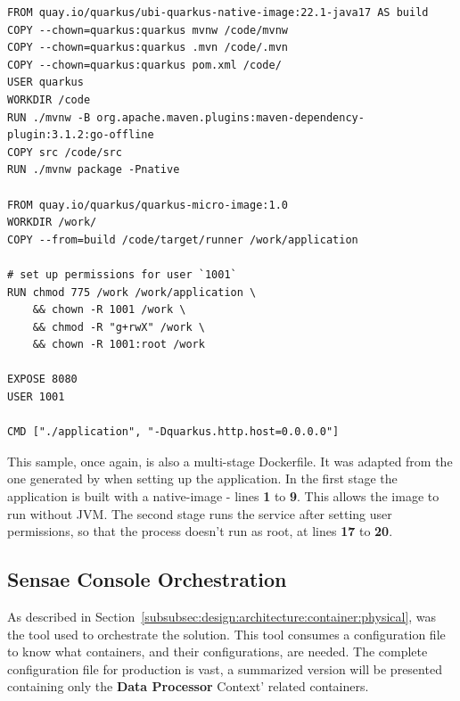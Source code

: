 \begin{lstlisting}[caption=Dockerfile for Device Commander, label={code:implementation:description:docker:quarkus}]
FROM quay.io/quarkus/ubi-quarkus-native-image:22.1-java17 AS build
COPY --chown=quarkus:quarkus mvnw /code/mvnw
COPY --chown=quarkus:quarkus .mvn /code/.mvn
COPY --chown=quarkus:quarkus pom.xml /code/
USER quarkus
WORKDIR /code
RUN ./mvnw -B org.apache.maven.plugins:maven-dependency-plugin:3.1.2:go-offline
COPY src /code/src
RUN ./mvnw package -Pnative

FROM quay.io/quarkus/quarkus-micro-image:1.0
WORKDIR /work/
COPY --from=build /code/target/runner /work/application

# set up permissions for user `1001`
RUN chmod 775 /work /work/application \
    && chown -R 1001 /work \
    && chmod -R "g+rwX" /work \
    && chown -R 1001:root /work

EXPOSE 8080
USER 1001

CMD ["./application", "-Dquarkus.http.host=0.0.0.0"]
\end{lstlisting}

This sample, once again, is also a multi-stage Dockerfile. It was adapted from the one generated by  when setting up the application. In the first stage the application is built with a  native-image - lines \textbf{1} to \textbf{9}. This allows the image to run without \gls{JVM}. The second stage runs the service after setting user permissions, so that the process doesn't run as root, at lines \textbf{17} to \textbf{20}.

\subsection{Sensae Console Orchestration}
\label{subsec:implementation:description:compose}

As described in Section~\ref{subsubsec:design:architecture:container:physical},  was the tool used to orchestrate the solution. This tool consumes a configuration file to know what containers, and their configurations, are needed. The complete configuration file for production is vast, a summarized version will be presented containing only the \textbf{Data Processor} Context' related containers.

